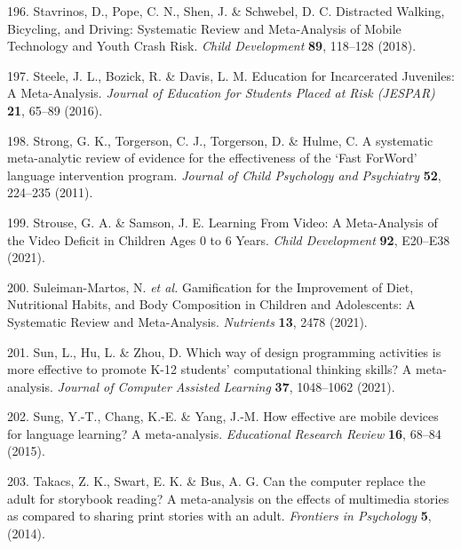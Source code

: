 \documentclass[
  english,
  man]{apa6}
\newenvironment{cslreferences}%
  {}%
  {\par}
\begin{document}
\begin{cslreferences}
\leavevmode\hypertarget{ref-stavrinosDistractedWalkingBicycling2018}{}%
196. Stavrinos, D., Pope, C. N., Shen, J. \& Schwebel, D. C. Distracted Walking, Bicycling, and Driving: Systematic Review and Meta-Analysis of Mobile Technology and Youth Crash Risk. \emph{Child Development} \textbf{89}, 118--128 (2018).

\leavevmode\hypertarget{ref-steeleEducationIncarceratedJuveniles2016}{}%
197. Steele, J. L., Bozick, R. \& Davis, L. M. Education for Incarcerated Juveniles: A Meta-Analysis. \emph{Journal of Education for Students Placed at Risk (JESPAR)} \textbf{21}, 65--89 (2016).

\leavevmode\hypertarget{ref-strongSystematicMetaanalyticReview2011}{}%
198. Strong, G. K., Torgerson, C. J., Torgerson, D. \& Hulme, C. A systematic meta-analytic review of evidence for the effectiveness of the `Fast ForWord' language intervention program. \emph{Journal of Child Psychology and Psychiatry} \textbf{52}, 224--235 (2011).

\leavevmode\hypertarget{ref-strouseLearningVideoMetaAnalysis2021}{}%
199. Strouse, G. A. \& Samson, J. E. Learning From Video: A Meta-Analysis of the Video Deficit in Children Ages 0 to 6 Years. \emph{Child Development} \textbf{92}, E20--E38 (2021).

\leavevmode\hypertarget{ref-suleiman-martosGamificationImprovementDiet2021}{}%
200. Suleiman-Martos, N. \emph{et al.} Gamification for the Improvement of Diet, Nutritional Habits, and Body Composition in Children and Adolescents: A Systematic Review and Meta-Analysis. \emph{Nutrients} \textbf{13}, 2478 (2021).

\leavevmode\hypertarget{ref-sunWhichWayDesign2021}{}%
201. Sun, L., Hu, L. \& Zhou, D. Which way of design programming activities is more effective to promote K-12 students' computational thinking skills? A meta-analysis. \emph{Journal of Computer Assisted Learning} \textbf{37}, 1048--1062 (2021).

\leavevmode\hypertarget{ref-sungHowEffectiveAre2015}{}%
202. Sung, Y.-T., Chang, K.-E. \& Yang, J.-M. How effective are mobile devices for language learning? A meta-analysis. \emph{Educational Research Review} \textbf{16}, 68--84 (2015).

\leavevmode\hypertarget{ref-takacsCanComputerReplace2014}{}%
203. Takacs, Z. K., Swart, E. K. \& Bus, A. G. Can the computer replace the adult for storybook reading? A meta-analysis on the effects of multimedia stories as compared to sharing print stories with an adult. \emph{Frontiers in Psychology} \textbf{5}, (2014).


\end{cslreferences}
\end{document}
